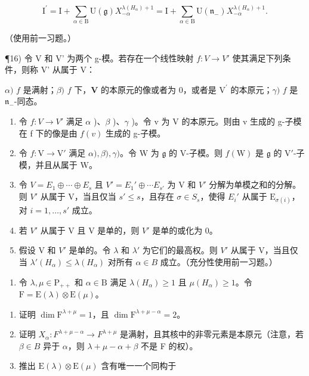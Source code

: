 \[
\mathrm{I} ^ {\prime} = \mathrm{I} + \sum_ {\alpha \in \mathrm{B}} \mathrm{U} (\mathfrak {g}) X _ {- \alpha} ^ {\lambda (H _ {\alpha}) + 1} = \mathrm{I} + \sum_ {\alpha \in \mathrm{B}} \mathrm{U} (\mathfrak {n} _ {-}) X _ {- \alpha} ^ {\lambda (H _ {\alpha}) + 1}.
\]

（使用前一习题。）

¶16) 令 V 和 V' 为两个 g-模。若存在一个线性映射 \(f : V \to V'\) 使其满足下列条件，则称 V' 从属于 V：

\(\alpha)\) \(f\) 是满射；\(\beta)\) \(f\) 下，\(\mathbf{V}\) 的本原元的像或者为 0，或者是 \(\mathrm{V}^{\prime}\) 的本原元；\(\gamma)\) \(f\) 是 \(\mathfrak{n}_{-}\)-同态。

\begin{enumerate}
\def\labelenumi{\alph{enumi})}
\item
  令 \(f: V \to V'\) 满足 \(\alpha\) )、\(\beta\) )、\(\gamma\) )。令 v 为 V 的本原元。则由 v 生成的 g-子模在 f 下的像是由 \(f(v)\) 生成的 g-子模。
\item
  令 \(f: \mathrm{V} \to \mathrm{V}'\) 满足 \(\alpha), \beta), \gamma)\)。令 \(\mathrm{W}\) 为 \(\mathfrak{g}\) 的 \(\mathrm{V}\)-子模。则 \(f(\mathrm{W})\) 是 \(\mathfrak{g}\) 的 \(\mathrm{V}'\)-子模，并且从属于 \(\mathrm{W}\)。
  \item
  令 \(V = E_{1} \oplus \cdots \oplus E_{s}\) 且 \(V' = E_{1}' \oplus \cdots E_{s'}\) 为 V 和 \(V'\) 分解为单模之和的分解。则 \(V'\) 从属于 V，当且仅当 \(s' \leq s\)，且存在 \(\sigma \in S_{s}\)，使得 \(E_{i}'\) 从属于 \(\mathrm{E}_{\sigma(i)}\)，对 \(i = 1, \ldots, s'\) 成立。
\item
  若 \(V'\) 从属于 V 且 V 是单的，则 \(V'\) 是单的或化为 0。
\item
  假设 V 和 \(V'\) 是单的。令 \(\lambda\) 和 \(\lambda'\) 为它们的最高权。则 \(V'\) 从属于 V，当且仅当 \(\lambda'(H_{\alpha}) \leq \lambda(H_{\alpha})\) 对所有 \(\alpha \in B\) 成立。（充分性使用前一习题。）
\end{enumerate}

\begin{enumerate}
\def\labelenumi{\arabic{enumi})}
\setcounter{enumi}{16}
\tightlist
\item
  令 \(\lambda, \mu \in \mathrm{P}_{++}\) 和 \(\alpha \in \mathrm{B}\) 满足 \(\lambda(H_{\alpha}) \geq 1\) 且 \(\mu(H_{\alpha}) \geq 1\)。令 \(\mathrm{F} = \mathrm{E}(\lambda) \otimes \mathrm{E}(\mu)\)。
\end{enumerate}

\begin{enumerate}
\def\labelenumi{\alph{enumi})}
\item
  证明 \(\dim \mathrm{F}^{\lambda +\mu} = 1\)，且 \(\dim \mathrm{F}^{\lambda +\mu -\alpha} = 2\)。
\item
  证明 \(X_{\alpha}: F^{\lambda+\mu-\alpha} \to F^{\lambda+\mu}\) 是满射，且其核中的非零元素是本原元（注意，若 \(\beta \in B\) 异于 \(\alpha\)，则 \(\lambda + \mu - \alpha + \beta\) 不是 F 的权）。
\item
  推出 \(\mathrm{E}(\lambda)\otimes\mathrm{E}(\mu)\) 含有唯一一个同构于
\end{enumerate}

